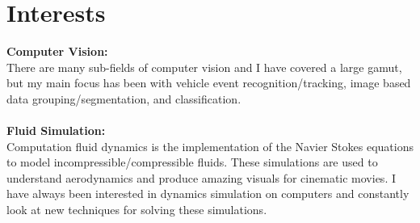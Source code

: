 \documentclass[]{friggeri-cv}
\begin{document}
\section{Interests}
    {\textbf{Computer Vision:}}\\
    {There are many sub-fields of computer vision and I have covered a large gamut, but my main focus has been with vehicle event recognition/tracking, image based data grouping/segmentation, and classification.}\\ \\
    {\textbf{Fluid Simulation:}}\\
    {Computation fluid dynamics is the implementation of the Navier Stokes equations to model incompressible/compressible fluids. These simulations are used to understand aerodynamics and produce amazing visuals for cinematic movies. I have always been interested in dynamics simulation on computers and constantly look at new techniques for solving these simulations.}

\end{document}

